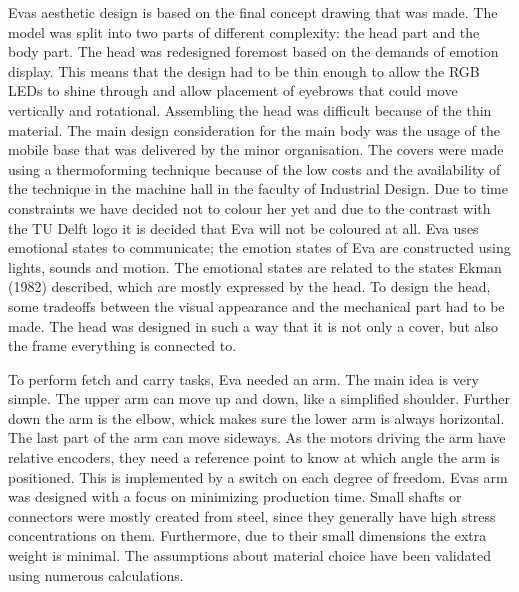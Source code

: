 \documentclass[project_eva.tex]{subfiles}
\begin{document}
Eva\textquotesingle s aesthetic design is based on the final concept drawing that was made. The model was split into two parts of different complexity: the head part and the body part. The head was redesigned foremost based on the demands of emotion display. This means that the design had to be thin enough to allow the RGB LEDs to shine through and allow placement of eyebrows that could move vertically and rotational. Assembling the head was difficult because of the thin material. The main design consideration for the main body was the usage of the mobile base that was delivered by the minor organisation. The covers were made using a thermoforming technique because of the low costs and the availability of the technique in the machine hall in the faculty of Industrial Design. Due to time constraints we have decided not to colour her yet and due to the contrast with the TU Delft logo it is decided that Eva will not be coloured at all. Eva uses emotional states to communicate; the emotion states of Eva are constructed using lights, sounds and motion. The emotional states are related to the states Ekman (1982) described, which are mostly expressed by the head. To design the head, some tradeoffs between the visual appearance and the mechanical part had to be made. The head was designed in such a way that it is not only a cover, but also the frame everything is connected to. 

To perform fetch and carry tasks, Eva needed an arm. The main idea is very simple. The upper arm can move up and down, like a simplified shoulder. Further down the arm is the elbow, whick makes sure the lower arm is always horizontal. The last part of the arm can move sideways. As the motors driving the arm have relative encoders, they need a reference point to know at which angle the arm is positioned. This is implemented by a switch on each degree of freedom. Eva\textquotesingle s arm was designed with a focus on minimizing production time. Small shafts or connectors were mostly created from steel, since they generally have high stress concentrations on them. Furthermore, due to their small dimensions the extra weight is minimal. The assumptions about material choice have been validated using numerous calculations. 
\end{document}
